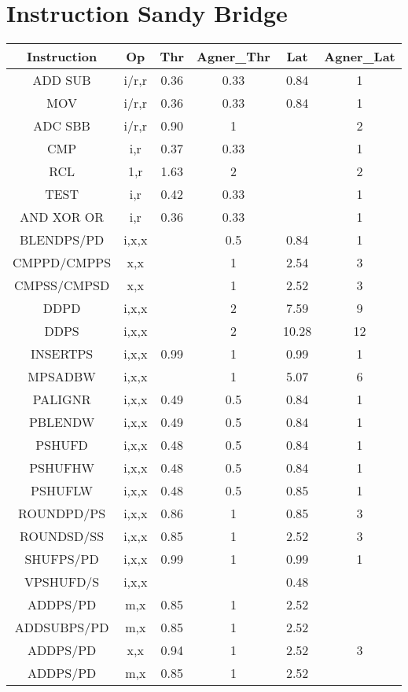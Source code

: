 \documentclass[11pt,a4paper]{article}
\begin{document}
\section{Instruction Sandy Bridge}

\begin{center}
\begin{tabular}{|c|c|c|c|c|c|}
\hline
Instruction & Op & Thr & Agner\_Thr & Lat & Agner\_Lat \\
\hline
ADD SUB & i/r,r & 0.36 & 0.33 & 0.84 & 1 \\
MOV & i/r,r & 0.36 & 0.33 & 0.84 & 1 \\
ADC SBB & i/r,r & 0.90 & 1 &  & 2 \\
CMP & i,r & 0.37 & 0.33 &  & 1 \\
RCL & 1,r & 1.63 & 2 &  & 2 \\
TEST & i,r & 0.42 & 0.33 &  & 1 \\
AND XOR OR & i,r & 0.36 & 0.33 &  & 1 \\
BLENDPS/PD & i,x,x &  & 0.5 & 0.84 & 1 \\
CMPPD/CMPPS & x,x &  & 1 & 2.54 & 3 \\
CMPSS/CMPSD & x,x &  & 1 & 2.52 & 3 \\
DDPD & i,x,x &  & 2 & 7.59 & 9 \\
DDPS & i,x,x &  & 2 & 10.28 & 12 \\
INSERTPS & i,x,x & 0.99 & 1 & 0.99 & 1 \\
MPSADBW & i,x,x &  & 1 & 5.07 & 6 \\
PALIGNR & i,x,x & 0.49 & 0.5 & 0.84 & 1 \\
PBLENDW & i,x,x & 0.49 & 0.5 & 0.84 & 1 \\
PSHUFD & i,x,x & 0.48 & 0.5 & 0.84 & 1 \\%
PSHUFHW & i,x,x & 0.48 & 0.5 & 0.84 & 1 \\%
PSHUFLW & i,x,x & 0.48 & 0.5 & 0.85 & 1 \\%
ROUNDPD/PS & i,x,x & 0.86 & 1 & 0.85 & 3 \\%
ROUNDSD/SS & i,x,x & 0.85 & 1 & 2.52 & 3 \\
SHUFPS/PD & i,x,x & 0.99 & 1 & 0.99 & 1 \\
VPSHUFD/S & i,x,x &  &  & 0.48 &  \\%
ADDPS/PD & m,x & 0.85 & 1 & 2.52 &  \\
ADDSUBPS/PD & m,x & 0.85 & 1 & 2.52 &  \\
ADDPS/PD & x,x & 0.94 & 1 & 2.52 & 3 \\
ADDPS/PD & m,x & 0.85 & 1 & 2.52 &  \\

\end{tabular}
\end{center}
\end{document}
